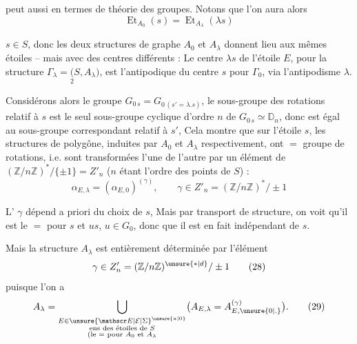 peut aussi   en termes de théorie des groupes. Notons que l'on aura alors
\[
\operatorname{Et}_{A_0}(s)=\operatorname{Et}_{A_\lambda}(\lambda s)\tag*{(26)}
\]


$s\in S$, donc les deux structures de graphe $A_0$ et $A_\lambda$ donnent lieu aux mêmes étoiles -- mais avec des centres différents : Le centre $\lambda s$ de l'étoile $E$, pour la structure $\Gamma_\lambda=\underset{2}{(}S,A_\lambda)$, est l'antipodique du centre $s$ pour $\Gamma_0$, via l'antipodisme $\lambda$.

Considérons alors le groupe $G_{0\,s}=G_{0\,(s'=\lambda.s)}$,  le sous-groupe des rotations relatif à  $s$ est le seul sous-groupe cyclique d'ordre $n$ de $G_{0\,s}\simeq\mathbb D_n$, donc est égal au sous-groupe correspondant  relatif à $s'$, Cela montre que sur l'étoile $s$, les structures de polygône, induites par $A_0$ et $A_\lambda$ respectivement, ont $=$ groupe de rotations, i.e. sont transformées l'une de l'autre par un élément \inserted{$\gamma$} de $(\mathbb Z/n\mathbb Z)^*/\{\pm1\}=Z'_n$ ($n$ étant l'ordre des points de $S$) :
\[
\alpha_{E,\lambda}=(\alpha_{E,0})^{(\gamma)},\qquad\gamma\in Z'_n=(\mathbb Z/n\mathbb Z)^*/\pm1\tag*{(27)}
\]

L' $\gamma$ dépend a priori du choix de $s$, Mais  par transport de structure, on voit qu'il est le $=$ pour $s$ et  $us$, $u\in G_0$, donc que il est en fait indépendant de $s$.

Mais   la structure $A_\lambda$ est entièrement déterminée par  l'élément
\[
\gamma\in Z'_n=(\mathbb Z/n\mathbb Z)^{\unsure{*|d}}/\pm1\tag*{(28)}
\]
puisque l'on a
\[
A_\lambda=\bigcup_{\substack{E\in{\unsure{\mathscr E|\mathcal E|\Sigma}}^{\unsure{a|0}}\\\text{ens des étoiles de } S\\(\text{le }=\text{ pour }A_0\text{ et }A_\lambda}}
\bigl(A_{E,\lambda}=A_{E,\unsure{0|.}}^{(\gamma)}\bigr).\tag*{(29)}
\]

